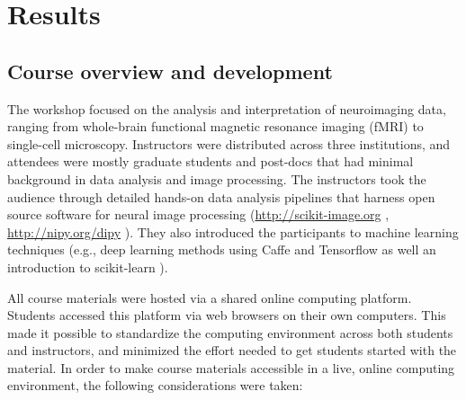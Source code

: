 \section{Results}

\subsection{Course overview and development}

The workshop focused on the analysis and interpretation of neuroimaging data,
ranging from whole-brain functional magnetic resonance imaging (fMRI) to
single-cell microscopy. Instructors were distributed across three institutions,
and attendees were mostly graduate students and post-docs that had minimal
background in data analysis and image processing. The instructors took the
audience through detailed hands-on data analysis pipelines that harness open
source software for neural image processing (\url{http://scikit-image.org}
\cite{van2014scikit}, \url{http://nipy.org/dipy}
\cite{Garyfallidis2014FrontNeuroinf}). They also introduced the participants to
machine learning techniques (e.g., deep learning methods using Caffe
\cite{jia2014caffe} and Tensorflow \cite{abadi2016tensorflow} as well an
introduction to scikit-learn \cite{Pedregosa2012-dm}).

All course materials were hosted via a shared online computing platform.
Students accessed this platform via web browsers on their own computers.
This made it possible to standardize the computing environment across both
students and instructors, and minimized the effort needed to get students
started with the material. In order to make course materials accessible in a
live, online computing environment, the following considerations were taken:

